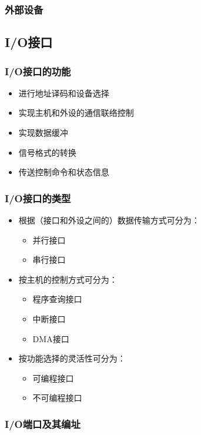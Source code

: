 \documentclass[12pt, a4paper, oneside]{ctexart}
\begin{document}
\subsubsection{外部设备}

\subsection{I/O接口}

\subsubsection{I/O接口的功能}

\begin{itemize}
  \item 进行地址译码和设备选择
  \item 实现主机和外设的通信联络控制
  \item 实现数据缓冲
  \item 信号格式的转换
  \item 传送控制命令和状态信息
\end{itemize}

\subsubsection{I/O接口的类型}

\begin{itemize}
  \item 根据（接口和外设之间的）数据传输方式可分为：
  \begin{itemize}
    \item 并行接口
    \item 串行接口
  \end{itemize}
  \item 按主机的控制方式可分为：
  \begin{itemize}
    \item 程序查询接口
    \item 中断接口
    \item DMA接口
  \end{itemize}
  \item 按功能选择的灵活性可分为：
  \begin{itemize}
    \item 可编程接口
    \item 不可编程接口
  \end{itemize}
\end{itemize}

\subsubsection{I/O端口及其编址}
\end{document}
